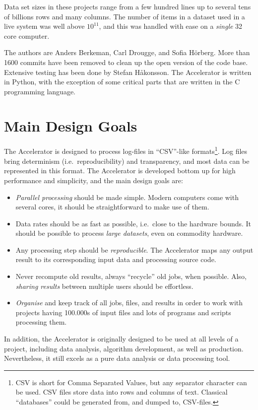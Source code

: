 Data set sizes in these projects range from a few hundred lines up to
several tens of billions rows and many columns.  The number of
items in a dataset used in a live system was well above $10^{11}$, and
this was handled with ease on a \emph{single} 32 core computer.

The authors are Anders Berkeman, Carl Drougge, and Sofia H\"orberg.
More than 1600 commits have been removed to clean up the open version
of the code base.  Extensive testing has been done by Stefan
H{\aa}konsson.  The Accelerator is written in Python, with the
exception of some critical parts that are written in the C programming
language.



\section{Main Design Goals}
The Accelerator is designed to process log-files in ``CSV''-like
formats\footnote{CSV is short for Comma Separated Values, but any
separator character can be used.  CSV files store data into rows and
columns of text.  Classical ``databases'' could be generated from, and
dumped to, CSV-files.}.  Log files bring determinism (i.e.\
reproducibility) and transparency, and most data can be represented in
this format.  The Accelerator is developed bottom up for high
performance and simplicity, and the main design goals are:
\begin{itemize}

\item[] \textsl{Parallel processing} should be made simple.  Modern computers
  come with several cores, it should be straightforward to make use of
  them.

\item[] Data rates should be as fast as possible, i.e.\ close to the hardware
bounds.  It should be possible to process \textsl{large datasets},
  even on commodity hardware.

\item[] Any processing step should be \textsl{reproducible}.
The Accelerator maps any output result to its corresponding input data and
processing source code.

\item[] Never recompute old results, always ``recycle'' old jobs, when
  possible.  Also, \textsl{sharing results} between multiple users should be
  effortless.

\item[] \textsl{Organise} and keep track of all jobs, files, and results in
  order to work with projects having 100.000s of input files and lots
  of programs and scripts processing them.
  
\end{itemize}
In addition, the Accelerator is originally designed to be used at all
levels of a project, including data analysis, algorithm development,
as well as production.  Nevertheless, it still excels as a pure data
analysis or data processing tool.
